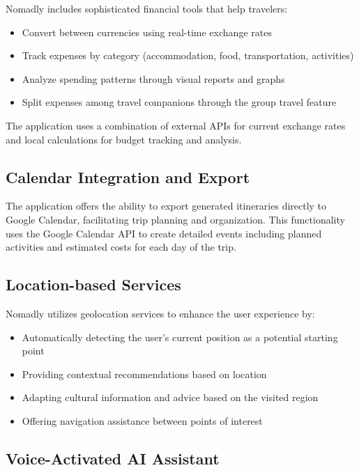 \documentclass[11pt, a4paper]{article}
\begin{document}
Nomadly includes sophisticated financial tools that help travelers:

\begin{itemize}
    \item Convert between currencies using real-time exchange rates
    \item Track expenses by category (accommodation, food, transportation, activities)
    \item Analyze spending patterns through visual reports and graphs
    \item Split expenses among travel companions through the group travel feature
\end{itemize}

The application uses a combination of external APIs for current exchange rates and local calculations for budget tracking and analysis.

\subsection{Calendar Integration and Export}

The application offers the ability to export generated itineraries directly to Google Calendar, facilitating trip planning and organization. This functionality uses the Google Calendar API to create detailed events including planned activities and estimated costs for each day of the trip.

\subsection{Location-based Services}

Nomadly utilizes geolocation services to enhance the user experience by:
\begin{itemize}
    \item Automatically detecting the user's current position as a potential starting point
    \item Providing contextual recommendations based on location
    \item Adapting cultural information and advice based on the visited region
    \item Offering navigation assistance between points of interest
    
\end{itemize}

\subsection{Voice-Activated AI Assistant}
\end{document}
